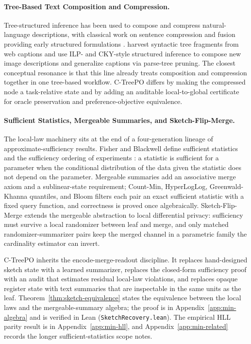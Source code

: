 \paragraph{Tree-Based Text Composition and Compression.}
Tree-structured inference has been used to compose and compress
natural-language descriptions, with classical work on sentence compression
and fusion providing early structured formulations
\citep{KnightMarcu2000SentenceCompression,BarzilayMcKeown2005SentenceFusion,ClarkeLapata2008ILPSentenceCompression}.
\citet{KuznetsovaEtAl2014TreeTalk} harvest syntactic tree fragments from
web captions and use ILP- and CKY-style structured inference to compose
new image descriptions and generalize captions via parse-tree pruning.
The closest conceptual resonance is that this line already treats
composition and compression together in one tree-based workflow. C-TreePO
differs by making the compressed node a task-relative state and by adding
an auditable local-to-global certificate for oracle preservation and
preference-objective equivalence.

\paragraph{Sufficient Statistics, Mergeable Summaries, and Sketch-Flip-Merge.}
The local-law machinery sits at the end of a four-generation lineage
of approximate-sufficiency results. Fisher and Blackwell define
sufficient statistics and the sufficiency ordering of experiments
\citep{Fisher1922,Blackwell1953}: a statistic is sufficient for a
parameter when the conditional distribution of the data given the
statistic does not depend on the parameter. Mergeable summaries
\citep{Agarwal2013MergeableTODS,FlajoletEtAl2007,CormodeMuthukrishnan2005,GreenwaldKhanna2001}
add an associative merge axiom and a sublinear-state requirement;
Count-Min, HyperLogLog, Greenwald-Khanna quantiles, and Bloom filters
each pair an exact sufficient statistic with a fixed query function,
and correctness is proved once algebraically. Sketch-Flip-Merge
\citep{HehirTingCormode2023SFM} extends the mergeable abstraction to
local differential privacy: sufficiency must survive a local
randomizer between leaf and merge, and only matched
randomizer-summarizer pairs keep the merged channel in a parametric
family the cardinality estimator can invert.

C-TreePO inherits the encode-merge-readout discipline. It replaces
hand-designed sketch state with a learned summarizer, replaces the
closed-form sufficiency proof with an audit that estimates residual
local-law violations, and replaces opaque register state with text
summaries that are inspectable in the same units as the leaf.
Theorem~\ref{thm:sketch-equivalence} states the equivalence between
the local laws and the mergeable-summary algebra; the proof is in
Appendix~\ref{app:min-algebra} and is verified in Lean
(\texttt{SketchRecovery.lean}). The empirical HLL parity result is in
Appendix~\ref{app:min-hll}, and Appendix~\ref{app:min-related} records
the longer sufficient-statistics scope notes.

